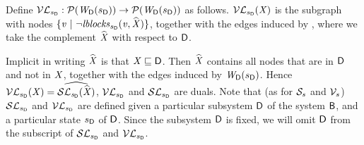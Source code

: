 \begin{definition}[$\lVFsymb_{\sD}$] \label{defn:violFixLoc}
Define $\lVFsymb_{\sD}: \lwfgS{B}{\sD}{\DS}  \to  \lwfgS{B}{\sD}{\DS}$ as follows.
$\lVFs{\sD}{\XS}$ is the subgraph with nodes $\set{\ndv \stt \neg \lblocks{\sD}{\ndv}{\complLoc{\XS}} }$, together with the edges induced by ,
where we take the complement $\complLoc{\XS}$ with respect to $\DS$.
\end{definition}
%
Implicit in writing $\complLoc{\XS}$ is that $\XS \subg \DS$. Then  $\complLoc{\XS}$ contains all nodes that are in $\DS$ and not in $\XS$, together 
with the edges induced by $\lwfg{B}{\sD}{\DS}$.
%
Hence $\lVFs{\sD}{\XS} = \complLoc{\lSFs{\sD}{\complLoc{\XS}}}$, \ie $\lVFsymb_{\sD}$ and $\lSFsymb_{\sD}$ are duals.
Note that (as for $\SFsymb_s$ and $\VFsymb_s$) $\lSFsymb_{\sD}$ and $\lVFsymb_{\sD}$ are defined given a particular
subsystem $\DS$ of the system 
$\B$, and a particular state $\sD$ of $\DS$. 
Since the subsystem $\DS$ is fixed, we will omit $\DS$ from the subscript of $\lSFsymb_{\sD}$ and $\lVFsymb_{\sD}$.



